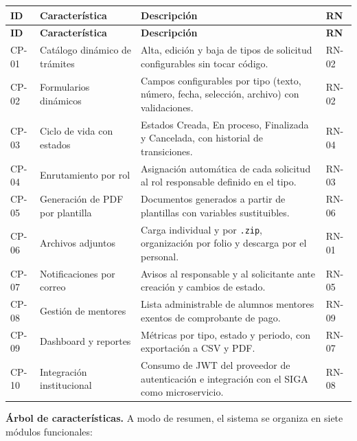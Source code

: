 \documentclass[12pt,letterpaper]{report}
\begin{document}
\begin{longtable}{|C{1.6cm}|L{4.5cm}|L{6cm}|C{1.4cm}|}
    \hline
    \textbf{ID} & \textbf{Característica} & \textbf{Descripción} & \textbf{RN} \\
    \hline
    \endfirsthead
    \hline
    \textbf{ID} & \textbf{Característica} & \textbf{Descripción} & \textbf{RN} \\
    \hline
    \endhead
    \hline
    \endfoot

    CP-01 & Catálogo dinámico de trámites & Alta, edición y baja de tipos de solicitud configurables sin tocar código. & RN-02 \\
    \hline
    CP-02 & Formularios dinámicos & Campos configurables por tipo (texto, número, fecha, selección, archivo) con validaciones. & RN-02 \\
    \hline
    CP-03 & Ciclo de vida con estados & Estados Creada, En proceso, Finalizada y Cancelada, con historial de transiciones. & RN-04 \\
    \hline
    CP-04 & Enrutamiento por rol & Asignación automática de cada solicitud al rol responsable definido en el tipo. & RN-03 \\
    \hline
    CP-05 & Generación de PDF por plantilla & Documentos generados a partir de plantillas con variables sustituibles. & RN-06 \\
    \hline
    CP-06 & Archivos adjuntos & Carga individual y por \texttt{.zip}, organización por folio y descarga por el personal. & RN-01 \\
    \hline
    CP-07 & Notificaciones por correo & Avisos al responsable y al solicitante ante creación y cambios de estado. & RN-05 \\
    \hline
    CP-08 & Gestión de mentores & Lista administrable de alumnos mentores exentos de comprobante de pago. & RN-09 \\
    \hline
    CP-09 & Dashboard y reportes & Métricas por tipo, estado y periodo, con exportación a CSV y PDF. & RN-07 \\
    \hline
    CP-10 & Integración institucional & Consumo de JWT del proveedor de autenticación e integración con el SIGA como microservicio. & RN-08 \\
    \hline
\end{longtable}

\noindent\textbf{Árbol de características.} A modo de resumen, el sistema se organiza en siete módulos funcionales:
\end{document}
